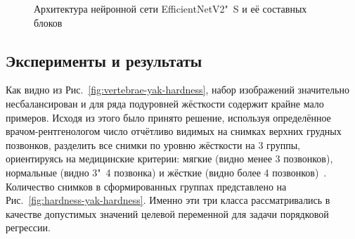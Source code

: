 \begin{figure}
	\centering
	
	\tabskip=0pt
	\caption{Архитектура нейронной сети EfficientNetV2"~S и её составных блоков~\cite{lee2023identification}}
	\label{fig:effnetv2s-architecture}
\end{figure}

\subsection{Эксперименты и результаты} \label{subsec:tb-hardness-experiments}

Как видно из Рис.~\ref{fig:vertebrae-yak-hardness}, набор изображений значительно несбалансирован и для ряда подуровней жёсткости содержит крайне мало примеров. Исходя из этого было принято решение, используя определённое врачом-рентгенологом число отчётливо видимых на снимках верхних грудных позвонков, разделить все снимки по уровню жёсткости на 3 группы, ориентируясь на медицинские критерии: мягкие (видно менее 3 позвонков), нормальные (видно 3"~4 позвонка) и жёсткие (видно более 4 позвонков)~\cite{тимофеева2013основные, сидоров2012методика}. Количество снимков в сформированных группах представлено на Рис.~\ref{fig:hardness-yak-hardness}. Именно эти три класса рассматривались в качестве допустимых значений целевой переменной для задачи порядковой регрессии.

